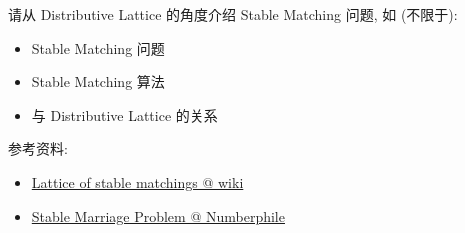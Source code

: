 \documentclass[a4paper, justified]{tufte-handout}
\begin{document}
\vspace{0.50cm}
\begin{ot}
  请从 Distributive Lattice 的角度介绍 Stable Matching 问题, 如 (不限于):
  \begin{itemize}
    \item Stable Matching 问题 
    \item Stable Matching 算法 
    \item 与 Distributive Lattice 的关系
  \end{itemize}

  \noindent 参考资料:
  \begin{itemize}
    \item \href{https://en.wikipedia.org/wiki/Lattice\_of\_stable\_matchings}{Lattice of stable matchings @ wiki}
    \item \href{https://www.youtube.com/watch?v=Qcv1IqHWAzg}{Stable Marriage Problem @ Numberphile}
  \end{itemize}
\end{ot}



\begincorrection


\beginfb

\end{document}
